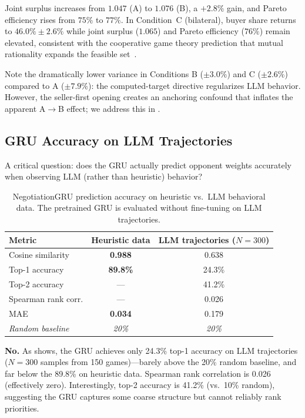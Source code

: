 \documentclass[11pt,a4paper]{article}
\begin{document}
Joint surplus increases from $1.047$ (A) to $1.076$ (B), a $+2.8\%$ gain, and Pareto efficiency rises from $75\%$ to $77\%$. In Condition~C (bilateral), buyer share returns to $46.0\% \pm 2.6\%$ while joint surplus ($1.065$) and Pareto efficiency ($76\%$) remain elevated, consistent with the cooperative game theory prediction that mutual rationality expands the feasible set~\citep{nash1950bargaining}.

Note the dramatically lower variance in Conditions B ($\pm 3.0\%$) and C ($\pm 2.6\%$) compared to A ($\pm 7.9\%$): the computed-target directive regularizes LLM behavior. However, the seller-first opening creates an anchoring confound that inflates the apparent A$\to$B effect; we address this in .

\subsection{GRU Accuracy on LLM Trajectories}
\label{sec:gru_accuracy}

A critical question: does the GRU actually predict opponent weights accurately when observing LLM (rather than heuristic) behavior?

\begin{table}[h]
\centering
\caption{NegotiationGRU prediction accuracy on heuristic vs.\ LLM behavioral data. The pretrained GRU is evaluated without fine-tuning on LLM trajectories.}
\label{tab:gru_accuracy}
\begin{tabular}{lcc}
\toprule
Metric & Heuristic data & LLM trajectories ($N = 300$) \\
\midrule
Cosine similarity & \textbf{0.988} & 0.638 \\
Top-1 accuracy & \textbf{89.8\%} & 24.3\% \\
Top-2 accuracy & --- & 41.2\% \\
Spearman rank corr. & --- & 0.026 \\
MAE & \textbf{0.034} & 0.179 \\
\midrule
\emph{Random baseline} & \emph{20\%} & \emph{20\%} \\
\bottomrule
\end{tabular}
\end{table}

\textbf{No.} As  shows, the GRU achieves only 24.3\% top-1 accuracy on LLM trajectories ($N = 300$ samples from 150 games)---barely above the 20\% random baseline, and far below the 89.8\% on heuristic data. Spearman rank correlation is 0.026 (effectively zero). Interestingly, top-2 accuracy is 41.2\% (vs.\ 10\% random), suggesting the GRU captures some coarse structure but cannot reliably rank priorities.
\end{document}
